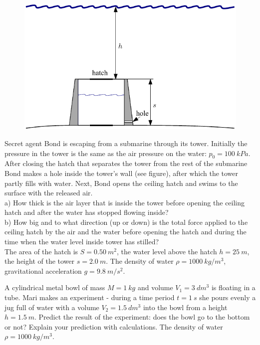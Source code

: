 \documentclass[11pt]{article}
\begin{document}
\probeng
\begin{figure}%
\includegraphics[width=\linewidth]{2012-lahg-05-allveelaev_g_ing}%
\end{figure}
Secret agent Bond is escaping from a submarine through its tower. Initially the pressure in the tower is the same as the air pressure on the water: $p_0 = \SI{100}{kPa}$. After closing the hatch that separates the tower from the rest of the submarine Bond makes a hole inside the tower’s wall (see figure), after which the tower partly fills with water. Next, Bond opens the ceiling hatch and swims to the surface with the released air.\\
a) How thick is the air layer that is inside the tower before opening the ceiling hatch and after the water has stopped flowing inside?\\
b) How big and to what direction (up or down) is the total force applied to the ceiling hatch by the air and the water before opening the hatch and during the time when the water level inside tower has stilled?\\
The area of the hatch is $S =
\SI{0,50}{m^2}$, the water level above the hatch $h=\SI{25}{m}$, the height of the tower $s=\SI{2,0}{m}$. The density of water $\rho = \SI{1000}{kg/m^3}$, gravitational acceleration $g =
\SI{9,8}{m/s^2}$.
\probend
\bigskip


\probeng
A cylindrical metal bowl of mass $M=\SI{1}{kg}$ and volume $V_1=\SI{3}{dm^3}$ is floating in a tube. Mari makes an experiment - during a time period $t=\SI{1}{s}$ she pours evenly a jug full of water with a volume $V_2=\SI{1,5}{dm^3}$ into the bowl from a height $h=\SI{1,5}{m}$. Predict the result of the experiment: does the bowl go to the bottom or not? Explain your prediction with calculations. The density of water $\rho=\SI{1000}{kg/m^3}$.
\probend
\bigskip
\end{document}
